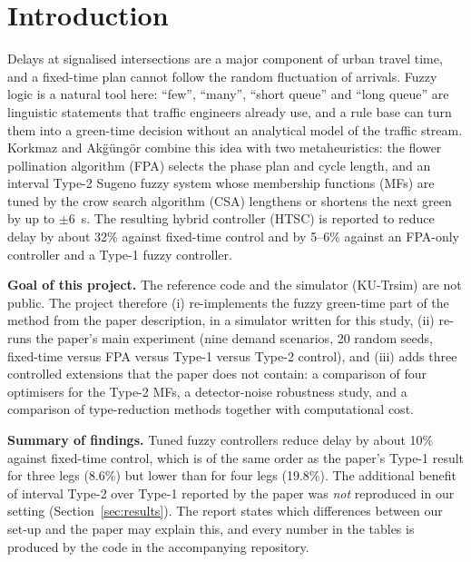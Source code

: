 \section{Introduction}
Delays at signalised intersections are a major component of urban travel time, and a fixed-time plan cannot follow the random
fluctuation of arrivals. Fuzzy logic is a natural tool here: ``few'', ``many'', ``short queue'' and ``long queue'' are linguistic
statements that traffic engineers already use, and a rule base can turn them into a green-time decision without an analytical model of
the traffic stream. Korkmaz and Ak{\"g}{\"u}ng{\"o}r \cite{ref_paper} combine this idea with two metaheuristics: the flower pollination
algorithm (FPA) selects the phase plan and cycle length, and an interval Type-2 Sugeno fuzzy system whose membership functions (MFs)
are tuned by the crow search algorithm (CSA) lengthens or shortens the next green by up to $\pm 6$~s. The resulting hybrid controller (HTSC)
is reported to reduce delay by about 32\% against fixed-time control and by 5--6\% against an FPA-only controller and a Type-1 fuzzy controller.

\textbf{Goal of this project.} The reference code and the simulator (KU-Trsim) are not public. The project therefore (i) re-implements the fuzzy
green-time part of the method from the paper description, in a simulator written for this study, (ii) re-runs the paper's main
experiment (nine demand scenarios, 20 random seeds, fixed-time versus FPA versus Type-1 versus Type-2 control), and (iii) adds three
controlled extensions that the paper does not contain: a comparison of four optimisers for the Type-2 MFs, a detector-noise robustness
study, and a comparison of type-reduction methods together with computational cost.

\textbf{Summary of findings.} Tuned fuzzy controllers reduce delay by about 10\% against fixed-time control, which is of the same order as the
paper's Type-1 result for three legs (8.6\%) but lower than for four legs (19.8\%). The additional benefit of interval Type-2 over Type-1 reported by the paper was \emph{not} reproduced in our
setting (Section~\ref{sec:results}). The report states which differences between our set-up and the paper may explain this, and every number in the
tables is produced by the code in the accompanying repository.

